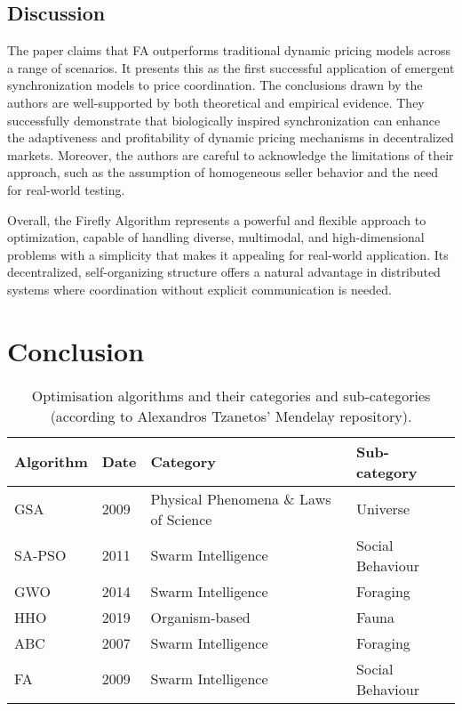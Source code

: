 \documentclass[a4paper, 12pt]{extarticle}
\begin{document}
\subsection{Discussion}

The paper \cite{jumadinova2008firefly} claims that FA outperforms traditional dynamic pricing models across a range of scenarios. It presents this as the first successful application of emergent synchronization models to price coordination. The conclusions drawn by the authors are well-supported by both theoretical and empirical evidence. They successfully demonstrate that biologically inspired synchronization can enhance the adaptiveness and profitability of dynamic pricing mechanisms in decentralized markets. Moreover, the authors are careful to acknowledge the limitations of their approach, such as the assumption of homogeneous seller behavior and the need for real-world testing.  

Overall, the Firefly Algorithm represents a powerful and flexible approach to optimization, capable of handling diverse, multimodal, and high-dimensional problems with a simplicity that makes it appealing for real-world application. Its decentralized, self-organizing structure offers a natural advantage in distributed systems where coordination without explicit communication is needed. 


\newpage
\section{Conclusion}

\begin{table}[h!]
    \centering
    \begin{tabular}{l l p{7cm} l} 
        \toprule
        \textbf{Algorithm} & \textbf{Date} & \textbf{Category} & \textbf{Sub-category} \\
        \midrule
        GSA         & 2009 & Physical Phenomena \& Laws of Science      & Universe  \\
        SA-PSO      & 2011 & Swarm Intelligence                         & Social Behaviour \\
        GWO         & 2014 & Swarm Intelligence                         & Foraging \\
        HHO         & 2019 & Organism-based                             & Fauna \\
        ABC         & 2007 & Swarm Intelligence                         & Foraging \\
        FA          & 2009 & Swarm Intelligence                         & Social Behaviour \\
        \bottomrule
    \end{tabular}
    \caption{Optimisation algorithms and their categories and sub-categories (according to Alexandros Tzanetos' Mendelay repository).}
\end{table}
\end{document}

